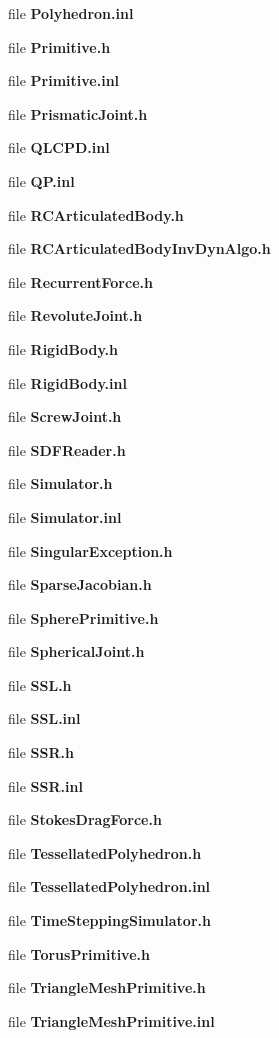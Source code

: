 \begin{DoxyCompactItemize}
file {\bfseries Polyhedron.\-inl}
\item 
file {\bfseries Primitive.\-h}
\item 
file {\bfseries Primitive.\-inl}
\item 
file {\bfseries Prismatic\-Joint.\-h}
\item 
file {\bfseries Q\-L\-C\-P\-D.\-inl}
\item 
file {\bfseries Q\-P.\-inl}
\item 
file {\bfseries R\-C\-Articulated\-Body.\-h}
\item 
file {\bfseries R\-C\-Articulated\-Body\-Inv\-Dyn\-Algo.\-h}
\item 
file {\bfseries Recurrent\-Force.\-h}
\item 
file {\bfseries Revolute\-Joint.\-h}
\item 
file {\bfseries Rigid\-Body.\-h}
\item 
file {\bfseries Rigid\-Body.\-inl}
\item 
file {\bfseries Screw\-Joint.\-h}
\item 
file {\bfseries S\-D\-F\-Reader.\-h}
\item 
file {\bfseries Simulator.\-h}
\item 
file {\bfseries Simulator.\-inl}
\item 
file {\bfseries Singular\-Exception.\-h}
\item 
file {\bfseries Sparse\-Jacobian.\-h}
\item 
file {\bfseries Sphere\-Primitive.\-h}
\item 
file {\bfseries Spherical\-Joint.\-h}
\item 
file {\bfseries S\-S\-L.\-h}
\item 
file {\bfseries S\-S\-L.\-inl}
\item 
file {\bfseries S\-S\-R.\-h}
\item 
file {\bfseries S\-S\-R.\-inl}
\item 
file {\bfseries Stokes\-Drag\-Force.\-h}
\item 
file {\bfseries Tessellated\-Polyhedron.\-h}
\item 
file {\bfseries Tessellated\-Polyhedron.\-inl}
\item 
file {\bfseries Time\-Stepping\-Simulator.\-h}
\item 
file {\bfseries Torus\-Primitive.\-h}
\item 
file {\bfseries Triangle\-Mesh\-Primitive.\-h}
\item 
file {\bfseries Triangle\-Mesh\-Primitive.\-inl}
\item 

\end{DoxyCompactItemize}
